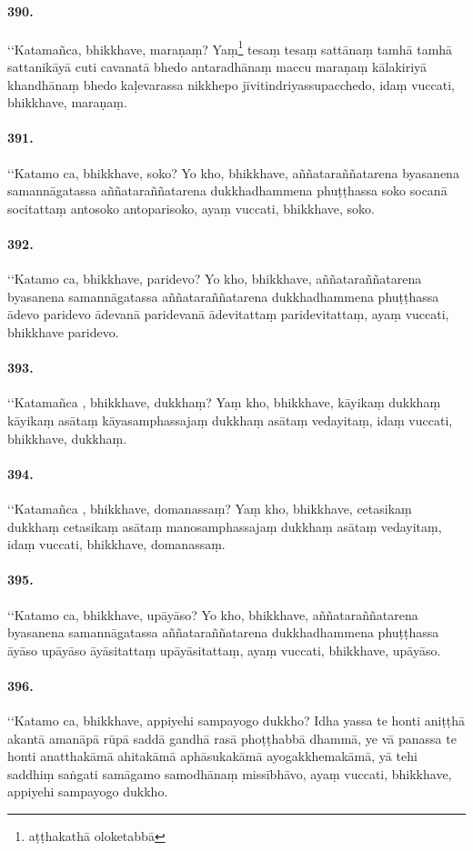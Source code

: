 \paragraph{390.} ‘‘Katamañca, bhikkhave, maraṇaṃ? Yaṃ\footnote{aṭṭhakathā oloketabbā} tesaṃ tesaṃ sattānaṃ tamhā tamhā sattanikāyā cuti cavanatā bhedo antaradhānaṃ maccu maraṇaṃ kālakiriyā khandhānaṃ bhedo kaḷevarassa nikkhepo jīvitindriyassupacchedo, idaṃ vuccati, bhikkhave, maraṇaṃ.

\paragraph{391.} ‘‘Katamo ca, bhikkhave, soko? Yo kho, bhikkhave, aññataraññatarena byasanena samannāgatassa aññataraññatarena dukkhadhammena phuṭṭhassa soko socanā socitattaṃ antosoko antoparisoko, ayaṃ vuccati, bhikkhave, soko.

\paragraph{392.} ‘‘Katamo ca, bhikkhave, paridevo? Yo kho, bhikkhave, aññataraññatarena byasanena samannāgatassa aññataraññatarena dukkhadhammena phuṭṭhassa ādevo paridevo ādevanā paridevanā ādevitattaṃ paridevitattaṃ, ayaṃ vuccati, bhikkhave paridevo.

\paragraph{393.} ‘‘Katamañca , bhikkhave, dukkhaṃ? Yaṃ kho, bhikkhave, kāyikaṃ dukkhaṃ kāyikaṃ asātaṃ kāyasamphassajaṃ dukkhaṃ asātaṃ vedayitaṃ, idaṃ vuccati, bhikkhave, dukkhaṃ.

\paragraph{394.} ‘‘Katamañca , bhikkhave, domanassaṃ? Yaṃ kho, bhikkhave, cetasikaṃ dukkhaṃ cetasikaṃ asātaṃ manosamphassajaṃ dukkhaṃ asātaṃ vedayitaṃ, idaṃ vuccati, bhikkhave, domanassaṃ.

\paragraph{395.} ‘‘Katamo ca, bhikkhave, upāyāso? Yo kho, bhikkhave, aññataraññatarena byasanena samannāgatassa aññataraññatarena dukkhadhammena phuṭṭhassa āyāso upāyāso āyāsitattaṃ upāyāsitattaṃ, ayaṃ vuccati, bhikkhave, upāyāso.

\paragraph{396.} ‘‘Katamo ca, bhikkhave, appiyehi sampayogo dukkho? Idha yassa te honti aniṭṭhā akantā amanāpā rūpā saddā gandhā rasā phoṭṭhabbā dhammā, ye vā panassa te honti anatthakāmā ahitakāmā aphāsukakāmā ayogakkhemakāmā, yā tehi saddhiṃ saṅgati samāgamo samodhānaṃ missībhāvo, ayaṃ vuccati, bhikkhave, appiyehi sampayogo dukkho.

